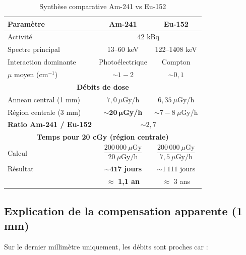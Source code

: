 \documentclass[11pt,a4paper]{article}
\begin{document}
\begin{table}[h]
\centering
\renewcommand{\arraystretch}{1.3}
\begin{tabular}{lcc}
\toprule
\rowcolor{headerblue!20}
\textbf{Paramètre} & \textbf{Am-241} & \textbf{Eu-152} \\
\midrule
Activité & \multicolumn{2}{c}{42 kBq} \\
\rowcolor{lightgray}
Spectre principal & 13--60 keV & 122--1408 keV \\
Interaction dominante & Photoélectrique & Compton \\
\rowcolor{lightgray}
$\mu$ moyen (cm$^{-1}$) & $\sim 1{-}2$ & $\sim 0{,}1$ \\
\midrule
\multicolumn{3}{c}{\cellcolor{headerblue!10}\textbf{Débits de dose}} \\
\midrule
Anneau central (1 mm) & $7{,}0~\mu$Gy/h & $6{,}35~\mu$Gy/h \\
\rowcolor{lightgray}
Région centrale (3 mm) & $\mathbf{\sim 20~\mu}$\textbf{Gy/h} & $\sim 7{-}8~\mu$Gy/h \\
\textbf{Ratio Am-241 / Eu-152} & \multicolumn{2}{c}{\textbf{$\sim 2{,}7$}} \\
\midrule
\multicolumn{3}{c}{\cellcolor{headerblue!10}\textbf{Temps pour 20 cGy (région centrale)}} \\
\midrule
Calcul & $\dfrac{200\,000~\mu\text{Gy}}{20~\mu\text{Gy/h}}$ & $\dfrac{200\,000~\mu\text{Gy}}{7{,}5~\mu\text{Gy/h}}$ \\[0.3cm]
\rowcolor{lightgray}
Résultat & $\mathbf{\sim 417}$ \textbf{jours} & $\sim 1\,111$ jours \\
& $\approx$ \textbf{1,1 an} & $\approx$ 3 ans \\
\bottomrule
\end{tabular}
\caption{Synthèse comparative Am-241 vs Eu-152}
\end{table}

\subsection{Explication de la compensation apparente (1 mm)}

Sur le dernier millimètre uniquement, les débits sont proches car :
\end{document}
